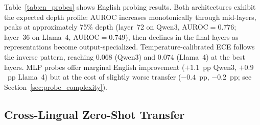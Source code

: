 \documentclass[11pt,a4paper]{article}
\begin{document}
Table~\ref{tab:en_probes} shows English probing results.
Both architectures exhibit the expected depth profile: AUROC increases monotonically through mid-layers, peaks at approximately 75\% depth (layer~72 on Qwen3, AUROC${=}0.776$; layer~36 on Llama~4, AUROC${=}0.749$), then declines in the final layers as representations become output-specialized.
Temperature-calibrated ECE follows the inverse pattern, reaching $0.068$ (Qwen3) and $0.074$ (Llama~4) at the best layers.
MLP probes offer marginal English improvement ($+1.1$~pp Qwen3, $+0.9$~pp Llama~4) but at the cost of slightly worse transfer ($-0.4$~pp, $-0.2$~pp; see Section~\ref{sec:probe_complexity}).

\subsection{Cross-Lingual Zero-Shot Transfer}
\end{document}
